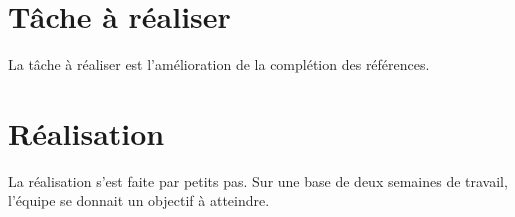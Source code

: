 \documentclass[a4paper,11pt]{report}
\begin{document}
\section{Tâche à réaliser} %
\label{sec:tache_a_realiser}
La tâche à réaliser est l'amélioration de la complétion des références.

\section{Réalisation}
La réalisation s'est faite par petits pas. Sur une base de deux semaines de travail, l'équipe se donnait un objectif à atteindre.
\end{document}
